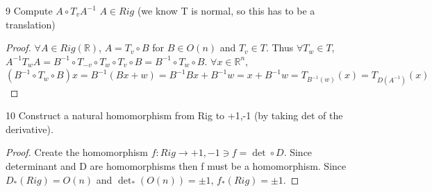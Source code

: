 \documentclass{article}
\newcommand{\R}{\mathbb{R}}
\begin{document}
\bigskip

\begin{PROB}{9}\label{Problem 9.}
    Compute $A \circ T_v A^{-1}$  $A \in Rig$ (we know T is normal, so this has to be a translation)
\end{PROB}
\begin{proof}
    $\forall A \in Rig(\R)$, $A = T_v \circ B$ for $B \in O(n)$ and $T_v \in T$. Thus $\forall T_w \in T$, $A^{-1} T_w A = B^{-1} \circ T_{-v} \circ T_w \circ  T_v \circ B = B^{-1} \circ T_w \circ B$. $\forall x \in \R^n$, $(B^{-1} \circ T_w \circ B)x = B^{-1}(Bx + w) = B^{-1}Bx + B^{-1}w = x + B^{-1}w =  T_{B^{-1}(w)}(x) = T_{D(A^{-1})}(x)$
\end{proof}

\bigskip

\begin{PROB}{10}\label{Problem 10.}
    Construct a natural homomorphism from Rig to {+1,-1} (by taking det of the derivative). 
\end{PROB}
\begin{proof}
    Create the homomorphism $f: Rig \to {+1, -1} \ni f = \det \circ D$. Since determinant and D are homomorphisms then f must be a homomorphism. Since $D_*(Rig) = O(n)$ and $\det_*(O(n)) = \pm 1$, $f_*(Rig) = \pm 1$.
\end{proof}
\end{document}
